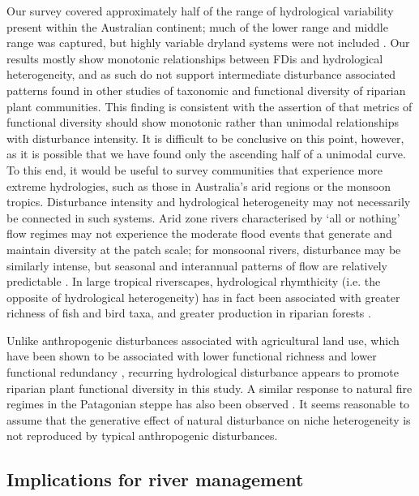 \documentclass[openright,12pt,a4paper]{memoir}
\begin{document}
Our survey covered approximately half of the range of hydrological variability present within the Australian continent; much of the lower range and middle range was captured, but highly variable dryland systems were not included \citep{Peel2004}. Our results mostly show monotonic relationships between FDis and hydrological heterogeneity, and as such do not support intermediate disturbance associated patterns found in other studies of taxonomic \citep{Bendix1997, Bendix2000, Lite2005, Corenblit2007} and functional diversity \citep{Biswas2010} of riparian plant communities. This finding is consistent with the assertion of \citet{Mouillot2013} that metrics of functional diversity should show monotonic rather than unimodal relationships with disturbance intensity. It is difficult to be conclusive on this point, however, as it is possible that we have found only the ascending half of a unimodal curve. To this end, it would be useful to survey communities that experience more extreme hydrologies, such as those in Australia’s arid regions or the monsoon tropics. Disturbance intensity and hydrological heterogeneity may not necessarily be connected in such systems. Arid zone rivers characterised by ‘all or nothing’ flow regimes may not experience the moderate flood events that generate and maintain diversity at the patch scale; for monsoonal rivers, disturbance may be similarly intense, but seasonal and interannual patterns of flow are relatively predictable \citep{Kennard2010}. In large tropical riverscapes, hydrological rhymthicity (i.e. the opposite of hydrological heterogeneity) has in fact been associated with greater richness of fish and bird taxa, and greater production in riparian forests \citep{Jardine2015}.

Unlike anthropogenic disturbances associated with agricultural land use, which have been shown to be associated with lower functional richness \citep{Pakeman2011} and lower functional redundancy \citep{Laliberte2010}, recurring hydrological disturbance appears to promote riparian plant functional diversity in this study. A similar response to natural fire regimes in the Patagonian steppe has also been observed \citep{sottile2015disturbance}. It seems reasonable to assume that the generative effect of natural disturbance on niche heterogeneity is not reproduced by typical anthropogenic disturbances.

\subsection*{Implications for river management}
 
\end{document}
